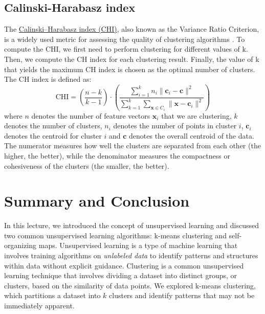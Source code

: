 \documentclass{article}[11pt]
\begin{document}
\subsection{Calinski-Harabasz index}
The \href{https://en.wikipedia.org/wiki/Calinski%E2%80%93Harabasz_index}{Calinski–Harabasz index (CHI)}, also known as the Variance Ratio Criterion, 
is a widely used metric for assessing the quality of clustering algorithms \citep{Caliski01011974}. To compute the CHI, we first need to perform clustering for different values of k. 
Then, we compute the CH index for each clustering result. Finally, the value of k that yields the maximum CH index is chosen as the optimal number of clusters. The CH index is defined as:
\begin{equation}
\text{CHI} = \left(\frac{n-k}{k-1}\right)\cdot\left(\frac{\sum_{i=1}^{k}n_{i}\lVert{\mathbf{c}_{i}-\mathbf{c}}\rVert^{2}}{\sum_{k=1}^{k}\sum_{\mathbf{x}\in{C_{i}}}\lVert{\mathbf{x}-\mathbf{c}_{i}}\rVert^{2}}\right)
\end{equation}
where $n$ denotes the number of feature vectors $\mathbf{x}_{i}$ that we are clustering, $k$ denotes the number of clusters, $n_{i}$ denotes the number of points in cluster $i$, $\mathbf{c}_{i}$ denotes the centroid for cluster $i$ and $\mathbf{c}$ denotes the overall centroid of the data. 
The numerator measures how well the clusters are separated from each other (the higher, the better), while the denominator measures the compactness or cohesiveness of the clusters (the smaller, the better).


\section{Summary and Conclusion}
In this lecture, we introduced the concept of unsupervised learning and discussed two common unsupervised learning algorithms: k-means clustering and self-organizing maps.
Unsupervised learning is a type of machine learning that involves training algorithms on \textit{unlabeled data} to identify patterns and structures within data without explicit guidance.
Clustering is a common unsupervised learning technique that involves dividing a dataset into distinct groups, or clusters, based on the similarity of data points.
We explored k-means clustering, which partitions a dataset into $k$ clusters and identify patterns that may not be immediately apparent.


\end{document}
